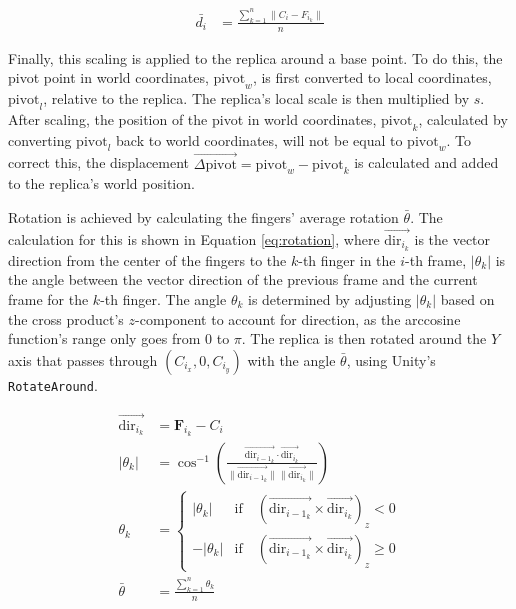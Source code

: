     \begin{figure}[h]
    \begin{equation}
    \begin{split} \label{eq:distance}
        \bar{d_i} &= \frac{\sum_{k = 1}^{n} \| C_i - F_{i_k} \|}{n}
    \end{split}
    \end{equation}
    \end{figure}
    
    Finally, this scaling is applied to the replica around a base point. To do this, the pivot point in world coordinates, \(\mathrm{pivot}_w\), is first converted to local coordinates, \(\mathrm{pivot}_l\), relative to the replica. The replica's local scale is then multiplied by \(s\). After scaling, the position of the pivot in world coordinates, \(\mathrm{pivot}_k\), calculated by converting \(\mathrm{pivot}_l\) back to world coordinates, will not be equal to \(\mathrm{pivot}_w\). To correct this, the displacement \(\vec{\Delta \mathrm{pivot}} = \mathrm{pivot}_w - \mathrm{pivot}_k\) is calculated and added to the replica's world position.

    Rotation is achieved by calculating the fingers' average rotation \(\bar{\theta}\). The calculation for this is shown in Equation \ref{eq:rotation}, where \(\vec{\mathrm{dir}_{i_k}}\) is the vector direction from the center of the fingers to the \(k\)-th finger in the \(i\)-th frame, \(|\theta_k|\) is the angle between the vector direction of the previous frame and the current frame for the \(k\)-th finger. The angle \(\theta_k\) is determined by adjusting \(|\theta_k|\) based on the cross product's \(z\)-component to account for direction, as the arccosine function's range only goes from \(0\) to \(\pi\). The replica is then rotated around the \(Y\) axis that passes through \((C_{i_x}, 0, C_{i_y})\) with the angle $\bar{\theta}$, using Unity's \lstinline{RotateAround}.

    \begin{equation}
    \begin{split} \label{eq:rotation}
        \vec{\mathrm{dir}_{i_k}} &= \mathbf{F}_{i_k} - C_i \\
        |\theta_k| &= \cos^{-1} \left( \frac{\vec{\mathrm{dir}_{{i-1}_k}} \cdot \vec{\mathrm{dir}_{i_k}}}{\|\vec{\mathrm{dir}_{{i-1}_k}}\| \|\vec{\mathrm{dir}_{i_k}}\|} \right) \\
        \theta_k &= \begin{cases} 
            |\theta_k| & \text{if} \quad (\vec{\mathrm{dir}_{{i-1}_k}} \times \vec{\mathrm{dir}_{i_k}})_z < 0 \\
            -|\theta_k| & \text{if} \quad (\vec{\mathrm{dir}_{{i-1}_k}} \times \vec{\mathrm{dir}_{i_k}})_z \geq 0
        \end{cases} \\
        \bar{\theta} &= \frac{\sum_{k=1}^{n} \theta_k}{n}
    \end{split}
    \end{equation}


